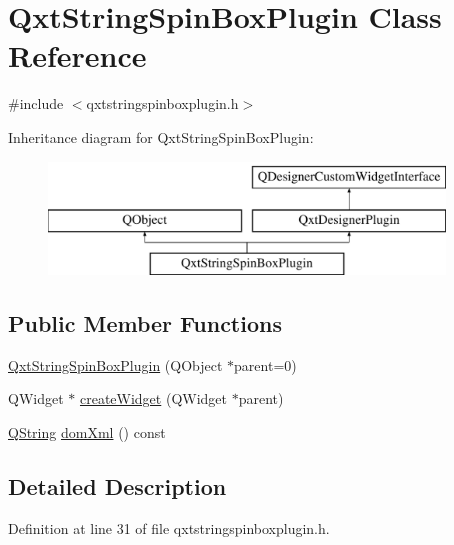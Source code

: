 \hypertarget{class_qxt_string_spin_box_plugin}{\section{Qxt\-String\-Spin\-Box\-Plugin Class Reference}
\label{class_qxt_string_spin_box_plugin}
}


{\ttfamily \#include $<$qxtstringspinboxplugin.\-h$>$}

Inheritance diagram for Qxt\-String\-Spin\-Box\-Plugin\-:\begin{figure}[H]
\begin{center}
\leavevmode
\includegraphics[height=3.000000cm]{class_qxt_string_spin_box_plugin}
\end{center}
\end{figure}
\subsection*{Public Member Functions}
\begin{DoxyCompactItemize}
\item 
\hyperlink{class_qxt_string_spin_box_plugin_a480f0019060cff2366010ac16eb8e145}{Qxt\-String\-Spin\-Box\-Plugin} (Q\-Object $\ast$parent=0)
\item 
Q\-Widget $\ast$ \hyperlink{class_qxt_string_spin_box_plugin_abc4c29f6a95b6b834607c61d4c14b74b}{create\-Widget} (Q\-Widget $\ast$parent)
\item 
\hyperlink{group___u_a_v_objects_plugin_gab9d252f49c333c94a72f97ce3105a32d}{Q\-String} \hyperlink{class_qxt_string_spin_box_plugin_a1b96b87c9c8f62a1fb7c04fcbc1c5f49}{dom\-Xml} () const 
\end{DoxyCompactItemize}


\subsection{Detailed Description}


Definition at line 31 of file qxtstringspinboxplugin.\-h.



